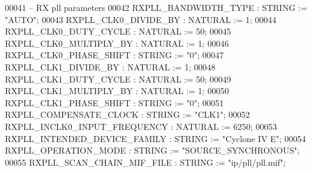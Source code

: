 \begin{DoxyCode}
00041 \textcolor{keyword}{      -- RX pll parameters}
00042       \textcolor{vhdlchar}{RXPLL_BANDWIDTH_TYPE}          \textcolor{vhdlchar}{:} \textcolor{comment}{STRING}    \textcolor{vhdlchar}{:=} \textcolor{keyword}{"AUTO"};
00043       \textcolor{vhdlchar}{RXPLL_CLK0_DIVIDE_BY}          \textcolor{vhdlchar}{:} \textcolor{comment}{NATURAL}   \textcolor{vhdlchar}{:=} \textcolor{vhdllogic}{}\textcolor{vhdllogic}{1};
00044       \textcolor{vhdlchar}{RXPLL_CLK0_DUTY_CYCLE}         \textcolor{vhdlchar}{:} \textcolor{comment}{NATURAL}   \textcolor{vhdlchar}{:=} \textcolor{vhdllogic}{}\textcolor{vhdllogic}{50};
00045       \textcolor{vhdlchar}{RXPLL_CLK0_MULTIPLY_BY}        \textcolor{vhdlchar}{:} \textcolor{comment}{NATURAL}   \textcolor{vhdlchar}{:=} \textcolor{vhdllogic}{}\textcolor{vhdllogic}{1};
00046       \textcolor{vhdlchar}{RXPLL_CLK0_PHASE_SHIFT}        \textcolor{vhdlchar}{:} \textcolor{comment}{STRING}    \textcolor{vhdlchar}{:=} \textcolor{vhdllogic}{"0"};
00047       \textcolor{vhdlchar}{RXPLL_CLK1_DIVIDE_BY}          \textcolor{vhdlchar}{:} \textcolor{comment}{NATURAL}   \textcolor{vhdlchar}{:=} \textcolor{vhdllogic}{}\textcolor{vhdllogic}{1};
00048       \textcolor{vhdlchar}{RXPLL_CLK1_DUTY_CYCLE}         \textcolor{vhdlchar}{:} \textcolor{comment}{NATURAL}   \textcolor{vhdlchar}{:=} \textcolor{vhdllogic}{}\textcolor{vhdllogic}{50};
00049       \textcolor{vhdlchar}{RXPLL_CLK1_MULTIPLY_BY}        \textcolor{vhdlchar}{:} \textcolor{comment}{NATURAL}   \textcolor{vhdlchar}{:=} \textcolor{vhdllogic}{}\textcolor{vhdllogic}{1};
00050       \textcolor{vhdlchar}{RXPLL_CLK1_PHASE_SHIFT}        \textcolor{vhdlchar}{:} \textcolor{comment}{STRING}    \textcolor{vhdlchar}{:=} \textcolor{vhdllogic}{"0"};
00051       \textcolor{vhdlchar}{RXPLL_COMPENSATE_CLOCK}        \textcolor{vhdlchar}{:} \textcolor{comment}{STRING}    \textcolor{vhdlchar}{:=} \textcolor{keyword}{"CLK1"};
00052       \textcolor{vhdlchar}{RXPLL_INCLK0_INPUT_FREQUENCY}  \textcolor{vhdlchar}{:} \textcolor{comment}{NATURAL}   \textcolor{vhdlchar}{:=} \textcolor{vhdllogic}{}\textcolor{vhdllogic}{6250};
00053       \textcolor{vhdlchar}{RXPLL_INTENDED_DEVICE_FAMILY}  \textcolor{vhdlchar}{:} \textcolor{comment}{STRING}    \textcolor{vhdlchar}{:=} \textcolor{keyword}{"Cyclone IV E"};
00054       \textcolor{vhdlchar}{RXPLL_OPERATION_MODE}          \textcolor{vhdlchar}{:} \textcolor{comment}{STRING}    \textcolor{vhdlchar}{:=} \textcolor{keyword}{"SOURCE\_SYNCHRONOUS"};
00055       \textcolor{vhdlchar}{RXPLL_SCAN_CHAIN_MIF_FILE}     \textcolor{vhdlchar}{:} \textcolor{comment}{STRING}    \textcolor{vhdlchar}{:=} \textcolor{keyword}{"ip/pll/pll.mif"};

\end{DoxyCode}
